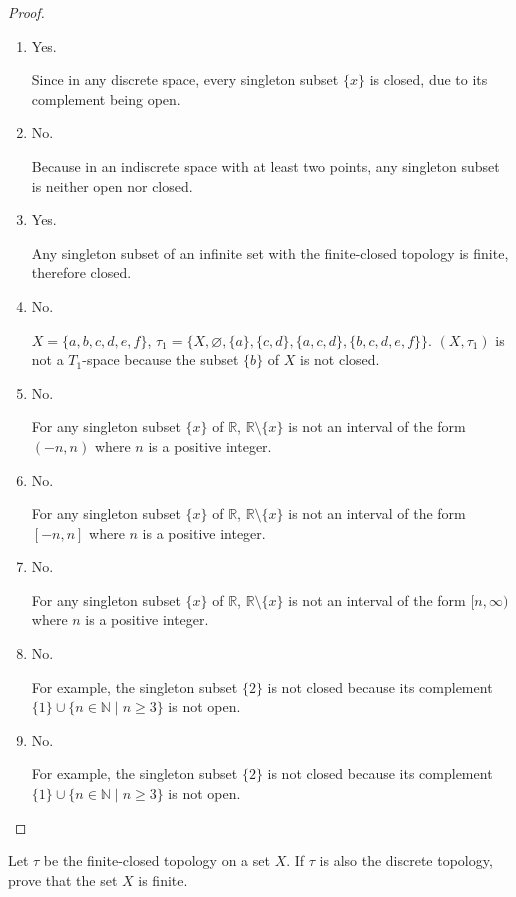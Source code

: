 \begin{proof}
    \begin{enumerate}[label={(\roman*)}]
        \item Yes.

              Since in any discrete space, every singleton subset $\{ x \}$ is closed, due to its complement being open.
        \item No.

              Because in an indiscrete space with at least two points, any singleton subset is neither open nor closed.
        \item Yes.

              Any singleton subset of an infinite set with the finite-closed topology is finite, therefore closed.
        \item No.

              $X = \{ a, b, c, d, e, f \}$, $\tau_{1} = \{ X, \varnothing, \{ a \}, \{ c, d \}, \{ a, c, d \}, \{ b, c, d, e, f \} \}$. $(X, \tau_{1})$ is not a $T_{1}$-space because the subset $\{ b \}$ of $X$ is not closed.
        \item No.

              For any singleton subset $\{ x \}$ of $\mathbb{R}$, $\mathbb{R}\setminus\{x\}$ is not an interval of the form $(-n, n)$ where $n$ is a positive integer.
        \item No.

              For any singleton subset $\{ x \}$ of $\mathbb{R}$, $\mathbb{R}\setminus\{x\}$ is not an interval of the form $[-n, n]$ where $n$ is a positive integer.
        \item No.

              For any singleton subset $\{ x \}$ of $\mathbb{R}$, $\mathbb{R}\setminus\{x\}$ is not an interval of the form $[n, \infty)$ where $n$ is a positive integer.
        \item No.

              For example, the singleton subset $\{ 2 \}$ is not closed because its complement $\{ 1 \}\cup \{ n\in\mathbb{N} \mid n\geq 3 \}$ is not open.
        \item No.

              For example, the singleton subset $\{ 2 \}$ is not closed because its complement $\{ 1 \}\cup \{ n\in\mathbb{N} \mid n\geq 3 \}$ is not open.
    \end{enumerate}
\end{proof}
\newpage

\begin{exercise}
    Let $\tau$ be the finite-closed topology on a set $X$. If $\tau$ is also the discrete topology, prove that the set $X$ is finite.
\end{exercise}

